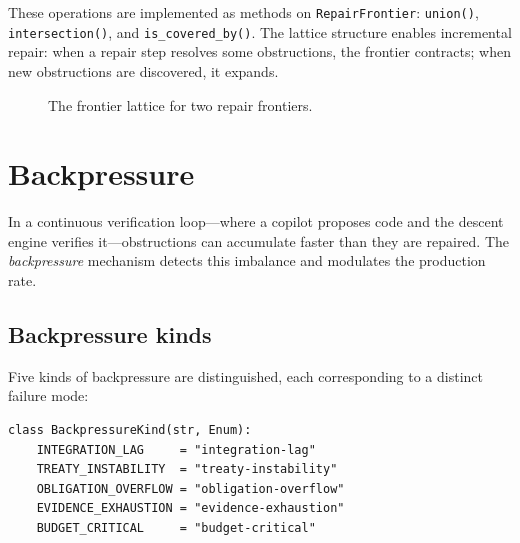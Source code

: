 \documentclass[11pt]{article}
\begin{document}
These operations are implemented as methods on \texttt{RepairFrontier}:
\texttt{union()}, \texttt{intersection()}, and \texttt{is\_covered\_by()}.
The lattice structure enables incremental repair: when a repair step
resolves some obstructions, the frontier contracts; when new obstructions
are discovered, it expands.

\begin{figure}[ht]
\centering
{}
\caption{The frontier lattice for two repair frontiers.}
\label{fig:frontier-lattice}
\end{figure}


\section{Backpressure}\label{sec:backpressure}

In a continuous verification loop---where a copilot proposes code and the
descent engine verifies it---obstructions can accumulate faster than they
are repaired.  The \emph{backpressure} mechanism detects this imbalance and
modulates the production rate.

\subsection{Backpressure kinds}

Five kinds of backpressure are distinguished, each corresponding to a
distinct failure mode:

\begin{lstlisting}[caption={Backpressure kinds.},label={lst:backpressure}]
class BackpressureKind(str, Enum):
    INTEGRATION_LAG     = "integration-lag"
    TREATY_INSTABILITY  = "treaty-instability"
    OBLIGATION_OVERFLOW = "obligation-overflow"
    EVIDENCE_EXHAUSTION = "evidence-exhaustion"
    BUDGET_CRITICAL     = "budget-critical"
\end{lstlisting}
\end{document}
